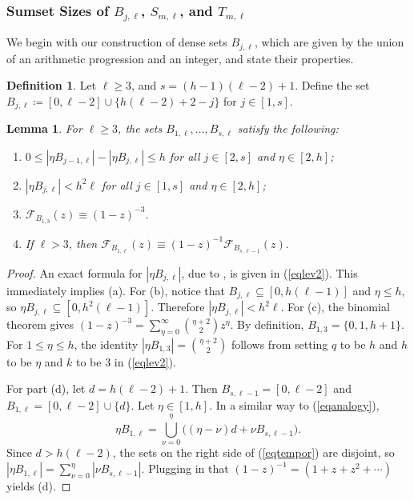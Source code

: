 \documentclass[10pt,a4paper]{article}
\newtheorem{lemma}[theorem]{Lemma}
\theoremstyle{definition}
\newtheorem{definition}[theorem]{Definition}
\theoremstyle{remark}
\numberwithin{equation}{section}
\numberwithin{theorem}{section}
\newcommand{\calf}{\mathcal{F}}
\begin{document}
\subsubsection{Sumset Sizes of \texorpdfstring{$B_{j,\ell}$}{Bjl}, \texorpdfstring{$S_{m,\ell}$}{Sml}, and \texorpdfstring{$T_{m,\ell}$}{Tml}}\label{sssection: components}
We begin with our construction of dense sets $B_{j,\ell}$, which are given by the union of an arithmetic progression and an integer, and state their properties. 
\begin{definition}
    Let $\ell \geq 3$, and $s = (h-1)(\ell-2)+1$. Define the set $B_{j,\ell} \coloneq  [0,\ell-2] \cup \{h(\ell-2)+2-j\}$ for $j \in [1,s]$.
\end{definition}
\begin{lemma}\label{lemmadense}
    For $\ell \geq 3$, the sets $B_{1,\ell},\ldots,B_{s,\ell}$ satisfy the following: \begin{enumerate}[label = (\alph*)]
        \item $0 \leq |\eta B_{j-1,\ell}|-|\eta B_{j,\ell}| \leq h$ for all $j \in [2,s]$ and $\eta \in [2,h]$;
        \item $|\eta B_{j,\ell}| < h^2\ell$ for all $j \in [1,s]$ and $\eta \in [2,h]$; 
        \item $\calf_{B_{1,3}}(z) \equiv (1-z)^{-3}.$
        \item If $\ell >3$, then $\calf_{B_{1,\ell}}(z) \equiv (1-z)^{-1}\calf_{B_{s,\ell-1}}(z).$
    \end{enumerate}
\end{lemma}
\begin{proof}
    An exact formula for $|\eta B_{j,\ell}|$, due to \cite{Lev96}, is given in (\ref{eqlev2}). This immediately implies (a). For (b), notice that $B_{j,\ell} \subseteq [0,h(\ell-1)]$ and $\eta \leq h$, so $\eta B_{j,\ell} \subseteq [0,h^2(\ell-1)]$. Therefore $|\eta B_{j,\ell}| < h^2\ell$. For (c), the binomial theorem gives $(1-z)^{-3} = \sum_{\eta = 0}^\infty \binom{\eta+2}{2}z^\eta$. By definition, $B_{1,3} = \{0,1,h+1\}$. For $1 \leq \eta \leq h$, the identity $|\eta B_{1,3}| = \binom{\eta+2}{2}$ follows from setting $q$ to be $h$ and $h$ to be $\eta$ and $k$ to be 3 in (\ref{eqlev2}).  
    
    For part (d), let $d = h(\ell-2)+1$. Then $B_{s,\ell-1} = [0,\ell-2]$ and $B_{1,\ell} = [0,\ell-2] \cup \{d\}$. Let $\eta \in [1,h]$. In a similar way to (\ref{eqanalogy}), \begin{equation}\label{eqtempor}
        \eta B_{1,\ell} = \bigcup_{\nu = 0}^\eta 
        \big((\eta-\nu)d+ \nu B_{s,\ell-1}\big). 
    \end{equation} Since $d > h(\ell-2)$, the sets on the right side of (\ref{eqtempor}) are disjoint, so $|\eta B_{1,\ell}| = \sum_{\nu = 0}^\eta|\nu B_{s,\ell-1}|$. Plugging in that $(1-z)^{-1} = (1+z+z^2+\cdots)$ yields (d).
\end{proof}
\end{document}
